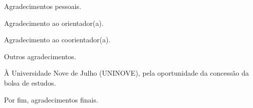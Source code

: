 \centeredchapterstyle
\begin{agradecimentos}
    \noindent Agradecimentos pessoais. \newline

    \noindent Agradecimento ao orientador(a).\newline
    
    \noindent Agradecimento ao coorientador(a).\newline
    
    \noindent Outros agradecimentos.\newline
    
    \noindent À Universidade Nove de Julho (UNINOVE), pela oportunidade da concessão da bolsa de estudos.\newline
    
    \noindent Por fim, agradecimentos finais.
\end{agradecimentos}
